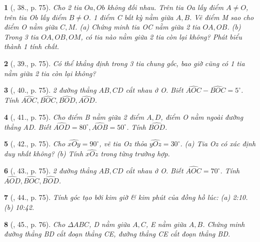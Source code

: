 \documentclass{article}
\newtheorem{baitoan}{}
\begin{document}
\begin{baitoan}[\cite{Binh_Toan_6_tap_2}, 38., p. 75]
	Cho 2 tia $Oa,Ob$ không đối nhau. Trên tia Oa lấy điểm $A\ne O$, trên tia Ob lấy điểm $B\ne O$. 1 điểm C bất kỳ nằm giữa $A,B$. Vẽ điểm M sao cho điểm O nằm giữa $C,M$. (a) Chứng minh tia OC nằm giữa 2 tia $OA,OB$. (b) Trong 3 tia $OA,OB,OM$, có tia nào nằm giữa 2 tia còn lại không? Phát biểu thành 1 tính chất.
\end{baitoan}

\begin{baitoan}[\cite{Binh_Toan_6_tap_2}, 39., p. 75]
	Có thể khẳng định trong 3 tia chung gốc, bao giờ cũng có 1 tia nằm giữa 2 tia còn lại không?
\end{baitoan}

\begin{baitoan}[\cite{Binh_Toan_6_tap_2}, 40., p. 75]
	2 đường thẳng $AB,CD$ cắt nhau ở O. Biết $ \widehat{AOC} - \widehat{BOC} = 5^\circ$. Tính $\widehat{AOC},\widehat{BOC},\widehat{BOD},\widehat{AOD}$.
\end{baitoan}

\begin{baitoan}[\cite{Binh_Toan_6_tap_2}, 41., p. 75]
	Cho điểm B nằm giữa 2 điểm $A,D$, điểm O nằm ngoài đường thẳng AD. Biết $\widehat{AOD} = 80^\circ,\widehat{AOB} = 50^\circ$. Tính $\widehat{BOD}$.
\end{baitoan}

\begin{baitoan}[\cite{Binh_Toan_6_tap_2}, 42., p. 75]
	Cho $\widehat{xOy} = 90^\circ$, vẽ tia Oz thỏa $\widehat{yOz} = 30^\circ$. (a) Tia Oz có xác định duy nhất không? (b) Tính $\widehat{xOz}$ trong từng trường hợp.
\end{baitoan}

\begin{baitoan}[\cite{Binh_Toan_6_tap_2}, 43., p. 75]
	2 đường thẳng $AB,CD$ cắt nhau ở O. Biết $\widehat{AOC} = 70^\circ$. Tính $\widehat{AOD},\widehat{BOC},\widehat{BOD}$.
\end{baitoan}

\begin{baitoan}[\cite{Binh_Toan_6_tap_2}, 44., p. 75]
	Tính góc tạo bởi kim giờ \& kim phút của đồng hồ lúc: (a) {\rm2:10}. (b) {\rm10:42}.
\end{baitoan}

\begin{baitoan}[\cite{Binh_Toan_6_tap_2}, 45., p. 76]
	Cho $\Delta ABC$, D nằm giữa $A,C$, E nằm giữa $A,B$. Chứng minh đường thẳng BD cắt đoạn thẳng CE, đường thẳng CE cắt đoạn thẳng BD.
\end{baitoan}
\end{document}
